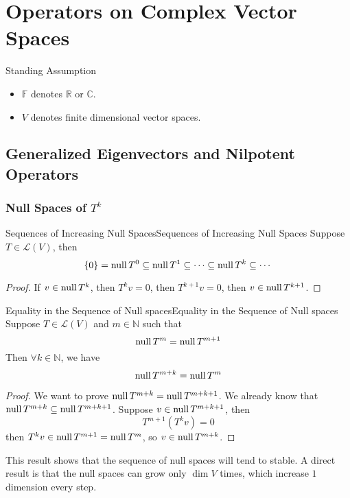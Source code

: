 \documentclass[../main.tex]{subfiles}
\begin{document}
\chapter{Operators on Complex Vector Spaces}

\begin{plainblackenv}
Standing Assumption
\tcblower\par
\begin{itemize}
\item $\mathbb{F}$ denotes $\mathbb{R}$ or $\mathbb{C}$.
\item $V$ denotes finite dimensional vector spaces.
\end{itemize}
\end{plainblackenv}

\section{Generalized Eigenvectors and Nilpotent Operators}

\subsection{Null Spaces of $T^k$}

\begin{proposition}{Sequences of Increasing Null Spaces}{Sequences of Increasing Null Spaces}
Suppose $T\in \mathscr{L}(V)$, then
\begin{equation*}
\left\{ 0 \right\} = \operatorname{null} T^0 \subseteq \operatorname{null} T^1 \subseteq \cdots \subseteq \operatorname{null} T^k \subseteq \cdots 
\end{equation*}
\end{proposition}
\begin{proof}
If $v\in \operatorname{null} T^k$, then $T^kv=0$, then $T^{k+1}v=0$, then $v\in \operatorname{null} T^{k+1}$.
\end{proof}

\begin{proposition}{Equality in the Sequence of Null spaces}{Equality in the Sequence of Null spaces}
Suppose $T\in \mathscr{L}(V)$ and $m\in \mathbb{N}$ such that
\begin{equation*}
\operatorname{null} T^m = \operatorname{null} T^{m+1}
\end{equation*}
Then $\forall k \in \mathbb{N}$, we have
\begin{equation*}
	\operatorname{null} T^{m+k} = \operatorname{null} T^m
\end{equation*}
\end{proposition}
\begin{proof}
We want to prove $\operatorname{null} T^{m+k} = \operatorname{null} T^{m+k+1}$. We already know that $\operatorname{null} T^{m+k} \subseteq \operatorname{null} T^{m+k+1}$. Suppose $v\in \operatorname{null} T^{m+k+1}$, then
\begin{equation*}
T^{m+1}(T^kv) = 0
\end{equation*}
then $T^k v \in \operatorname{null} T^{m+1} = \operatorname{null} T^m$, so $v\in \operatorname{null} T^{m+k}$.
\end{proof}
This result shows that the sequence of null spaces will tend to stable. A direct result is that the null spaces can grow only $\dim V$ times, which increase $1$ dimension every step.
\end{document}
